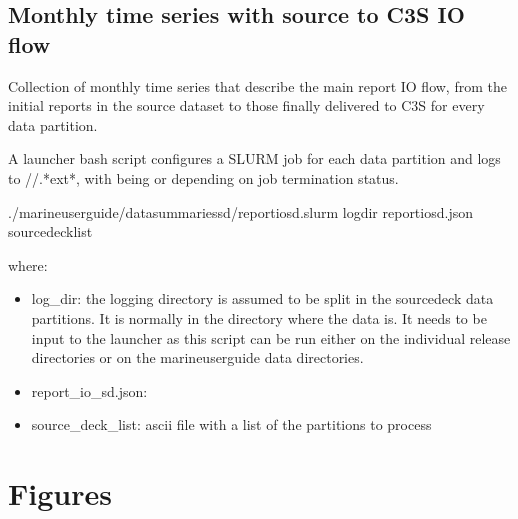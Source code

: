 \documentclass[letterpaper,10pt,english]{sphinxmanual}
\begin{document}
\subsection{Monthly time series with source to C3S IO flow}
\label{\detokenize{index:monthly-time-series-with-source-to-c3s-io-flow}}\label{\detokenize{index:report-io-sd-section}}
Collection of monthly time series that describe the main report IO flow, from
the initial reports in the source dataset to those finally delivered to C3S for
every  data partition.

A launcher bash script configures a SLURM job for each  data partition
and logs to //.*ext*, with  being  or
 depending on job termination status.

\begin{sphinxVerbatim}[commandchars=\\\{\}]
./marine\PYGZhy{}user\PYGZhy{}guide/data\PYGZus{}summaries\PYGZus{}sd/report\PYGZus{}io\PYGZus{}sd.slurm log\PYGZus{}dir report\PYGZus{}io\PYGZus{}sd.json source\PYGZus{}deck\PYGZus{}list
\end{sphinxVerbatim}

where:
\begin{itemize}
\item {} 
log\_dir: the logging directory is assumed to be split in the source\sphinxhyphen{}deck data
partitions. It is normally  in the directory where the data is.
It needs to be input to the launcher as this script can be run either on the
individual release directories or on the marine\sphinxhyphen{}user\sphinxhyphen{}guide data directories.

\item {} 
report\_io\_sd.json: {\hyperref[\detokenize{index:report-io-sd}]{}}

\item {} 
source\_deck\_list: ascii file with a list of the  partitions to process

\end{itemize}


\section{Figures}
\label{\detokenize{index:id5}}
\end{document}
